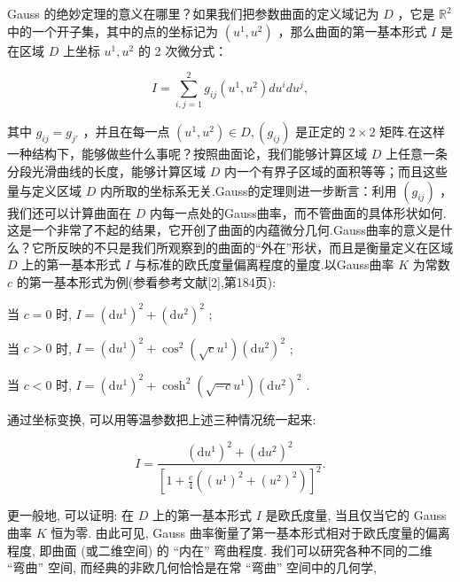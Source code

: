 Gauss 的绝妙定理的意义在哪里？如果我们把参数曲面的定义域记为  $D$ ，它是  $\mathbb{R}^2$  中的一个开子集，其中的点的坐标记为  $(u^1, u^2)$ ，那么曲面的第一基本形式  $I$  是在区域  $D$  上坐标  $u^1, u^2$  的 2 次微分式：

$$
I = \sum_ {i, j = 1} ^ {2} g _ {i j} (u ^ {1}, u ^ {2}) d u ^ {i} d u ^ {j},
$$

其中  $g_{ij} = g_{j\prime}$  ，并且在每一点  $(u^{1},u^{2})\in D,(g_{ij})$  是正定的  $2\times 2$  矩阵.在这样一种结构下，能够做些什么事呢？按照曲面论，我们能够计算区域  $D$  上任意一条分段光滑曲线的长度，能够计算区域  $D$  内一个有界子区域的面积等等；而且这些量与定义区域  $D$  内所取的坐标系无关.Gauss的定理则进一步断言：利用  $(g_{ij})$  ，我们还可以计算曲面在  $D$  内每一点处的Gauss曲率，而不管曲面的具体形状如何.这是一个非常了不起的结果，它开创了曲面的内蕴微分几何.Gauss曲率的意义是什么？它所反映的不只是我们所观察到的曲面的“外在”形状，而且是衡量定义在区域  $D$  上的第一基本形式  $I$  与标准的欧氏度量偏离程度的量度.以Gauss曲率  $K$  为常数  $c$  的第一基本形式为例(参看参考文献[2],第184页):

当  $c = 0$  时,  $I = (\mathrm{d}u^{1})^{2} + (\mathrm{d}u^{2})^{2}$ ;

当  $c > 0$  时,  $I = (\mathrm{d}u^{1})^{2} + \cos^{2}(\sqrt{c} u^{1})(\mathrm{d}u^{2})^{2}$ ;

当  $c < 0$  时,  $I = (\mathrm{d}u^{1})^{2} + \cosh^{2}(\sqrt{-c} u^{1})(\mathrm{d}u^{2})^{2}$ .

通过坐标变换, 可以用等温参数把上述三种情况统一起来:

$$
I = \frac {(\mathrm {d} u ^ {1}) ^ {2} + (\mathrm {d} u ^ {2}) ^ {2}}{[ 1 + \frac {c}{4} ((u ^ {1}) ^ {2} + (u ^ {2}) ^ {2}) ] ^ {2}}.
$$

更一般地, 可以证明: 在  $D$  上的第一基本形式  $I$  是欧氏度量, 当且仅当它的 Gauss 曲率  $K$  恒为零. 由此可见, Gauss 曲率衡量了第一基本形式相对于欧氏度量的偏离程度, 即曲面 (或二维空间) 的 “内在” 弯曲程度. 我们可以研究各种不同的二维 “弯曲” 空间, 而经典的非欧几何恰恰是在常 “弯曲” 空间中的几何学,

